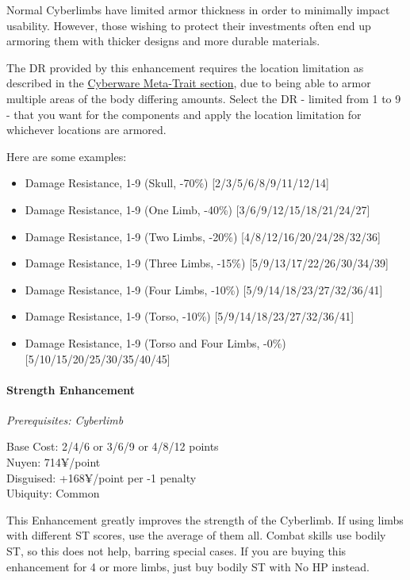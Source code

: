 \begin{multicols*}{3}
	Normal Cyberlimbs have limited armor thickness in order to minimally impact usability. However, those wishing to protect their investments often end up armoring them with thicker designs and more durable materials.
	
	The DR provided by this enhancement requires the location limitation as described in the \hyperref[cyberware-meta-trait]{Cyberware Meta-Trait section}, due to being able to armor multiple areas of the body differing amounts. Select the DR - limited from 1 to 9 - that you want for the components and apply the location limitation for whichever locations are armored.
	
	Here are some examples:
	
	\begin{itemize}
		\itemsep0em 
		\item Damage Resistance, 1-9 (Skull, -70\%) [2/3/5/6/8/9/11/12/14]
		\item Damage Resistance, 1-9 (One Limb, -40\%) [3/6/9/12/15/18/21/24/27]
		\item Damage Resistance, 1-9 (Two Limbs, -20\%) [4/8/12/16/20/24/28/32/36]
		\item Damage Resistance, 1-9 (Three Limbs, -15\%) [5/9/13/17/22/26/30/34/39]
		\item Damage Resistance, 1-9 (Four Limbs, -10\%) [5/9/14/18/23/27/32/36/41]
		\item Damage Resistance, 1-9 (Torso, -10\%) [5/9/14/18/23/27/32/36/41]
		\item Damage Resistance, 1-9 (Torso and Four Limbs, -0\%) [5/10/15/20/25/30/35/40/45]
	\end{itemize}
	
	\paragraph{Strength Enhancement}
	\textit{Prerequisites: Cyberlimb}
	\begin{flushright}
		Base Cost: 2/4/6 or 3/6/9 or 4/8/12 points\\
		Nuyen: 714¥/point\\
		Disguised: +168¥/point per -1 penalty\\
		Ubiquity: Common\\
	\end{flushright}

	This Enhancement greatly improves the strength of the Cyberlimb. If using limbs with different ST scores, use the average of them all. Combat skills use bodily ST, so this does not help, barring special cases. If you are buying this enhancement for 4 or more limbs, just buy bodily ST with No HP instead. 
	

\end{multicols*}
